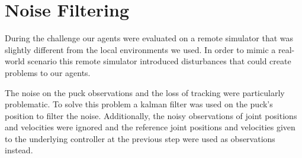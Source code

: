 \section{Noise Filtering}
\label{sec:noise_filtering}

During the challenge our agents were evaluated on a remote simulator that was slightly different from the local environments we used.
In order to mimic a real-world scenario this remote simulator introduced disturbances that could create problems to our agents.

The noise on the puck observations and the loss of tracking were particularly problematic.
To solve this problem a  kalman filter \cite{kalman_filter} was used on the puck's position to filter the noise.
Additionally, the noisy observations of joint positions and velocities were ignored and the reference joint positions and velocities given to the underlying
controller at the previous step were used as observations instead.